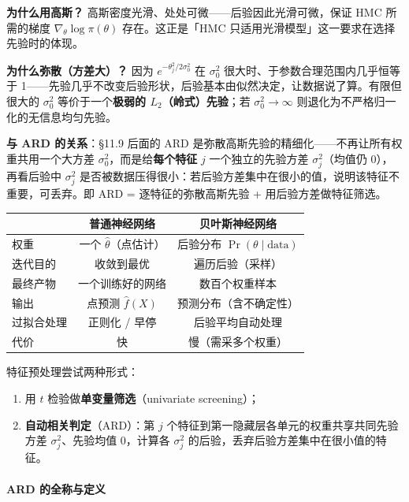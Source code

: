 \textbf{为什么用高斯？} 高斯密度光滑、处处可微——后验因此光滑可微，保证 HMC 所需的梯度 $\nabla_\theta\log\pi(\theta)$ 存在。这正是「HMC 只适用光滑模型」这一要求在选择先验时的体现。

\textbf{为什么弥散（方差大）？} 因为 $e^{-\theta_j^2/2\sigma_0^2}$ 在 $\sigma_0^2$ 很大时、于参数合理范围内几乎恒等于 1——先验几乎不改变后验形状，后验基本由似然决定，让数据说了算。有限但很大的 $\sigma_0^2$ 等价于一个\textbf{极弱的 $L_2$（岭式）先验}；若 $\sigma_0^2\to\infty$ 则退化为不严格归一化的无信息均匀先验。

\textbf{与 ARD 的关系}：§11.9 后面的 ARD 是弥散高斯先验的精细化——不再让所有权重共用一个大方差 $\sigma_0^2$，而是给\textbf{每个特征} $j$ 一个独立的先验方差 $\sigma_j^2$（均值仍 0），再看后验中 $\sigma_j^2$ 是否被数据压得很小：若后验方差集中在很小的值，说明该特征不重要，可丢弃。即 ARD = 逐特征的弥散高斯先验 + 用后验方差做特征筛选。

\begin{remark}
\begin{center}
\begin{tabular}{lcc}
\toprule
 & 普通神经网络 & 贝叶斯神经网络 \\
\midrule
权重 & 一个 $\hat\theta$（点估计） & 后验分布 $\Pr(\theta\mid \text{data})$ \\
迭代目的 & 收敛到最优 & 遍历后验（采样） \\
最终产物 & 一个训练好的网络 & 数百个权重样本 \\
输出 & 点预测 $\hat f(X)$ & 预测分布（含不确定性） \\
过拟合处理 & 正则化 / 早停 & 后验平均自动处理 \\
代价 & 快 & 慢（需采多个权重） \\
\bottomrule
\end{tabular}
\end{center}
\end{remark}

特征预处理尝试两种形式：
\begin{enumerate}
\item 用 $t$ 检验做\textbf{单变量筛选}（univariate screening）；
\item \textbf{自动相关判定}（ARD）：第 $j$ 个特征到第一隐藏层各单元的权重共享共同先验方差 $\sigma_j^2$、先验均值 0，计算各 $\sigma_j^2$ 的后验，丢弃后验方差集中在很小值的特征。
\end{enumerate}

\paragraph{ARD 的全称与定义}

